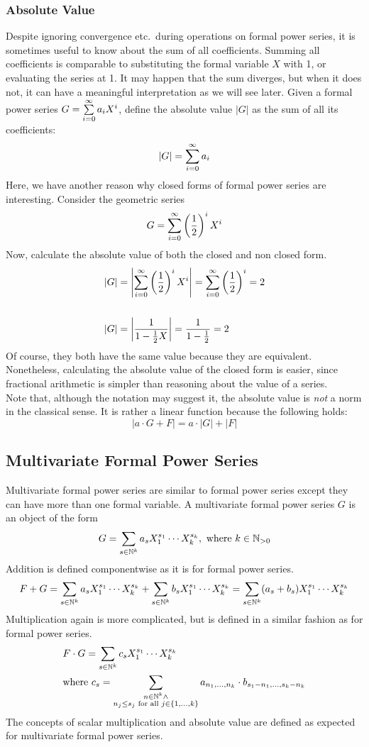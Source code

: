 \subsubsection*{Absolute Value}
Despite ignoring convergence etc.\ during operations on formal power series, it is sometimes useful to know about the sum of all coefficients.
Summing all coefficients is comparable to substituting the formal variable $X$ with 1, or evaluating the series at 1.
It may happen that the sum diverges, but when it does not, it can have a meaningful interpretation as we will see later.
Given a formal power series $G = \sum\limits_{i = 0}^{\infty} a_i X^i$, define the absolute value $|G|$ as the sum of all its coefficients:
\[ |G| = \sum\limits_{i = 0}^{\infty} a_i \]
Here, we have another reason why closed forms of formal power series are interesting.
Consider the geometric series
\[ G = \sum\limits_{i = 0}^{\infty} \left( \frac{1}{2} \right)^i X^i \]
Now, calculate the absolute value of both the closed and non closed form.
\begin{align*}
	|G| &= \left| \sum\limits_{i = 0}^{\infty} \left( \frac{1}{2} \right)^i X^i \right| = \sum\limits_{i = 0}^{\infty} \left( \frac{1}{2} \right)^i = 2 \\
	\\
	|G| &= \left| \frac{1}{1 - \frac{1}{2} X} \right| = \frac{1}{1 - \frac{1}{2}} = 2
\end{align*}
Of course, they both have the same value because they are equivalent.
Nonetheless, calculating the absolute value of the closed form is easier, since fractional arithmetic is simpler than reasoning about the value of a series. \\
Note that, although the notation may suggest it, the absolute value is \emph{not} a norm in the classical sense.
It is rather a linear function because the following holds:
\[ |a \cdot G + F| = a \cdot |G| + |F| \]

\subsection{Multivariate Formal Power Series}
Multivariate formal power series are similar to formal power series except they can have more than one formal variable.
A multivariate formal power series $G$ is an object of the form
\[ G = \sum\limits_{s \in \mathbb{N}^k} a_s X_1^{s_1} \cdots X_k^{s_k} , \text{ where } k \in \mathbb{N}_{> 0} \]
Addition is defined componentwise as it is for formal power series.
\[ F + G = \sum\limits_{s \in \mathbb{N}^k} a_s X_1^{s_1} \cdots X_k^{s_k} + \sum\limits_{s \in \mathbb{N}^k} b_s X_1^{s_1} \cdots X_k^{s_k} = \sum\limits_{s \in \mathbb{N}^k} (a_s + b_s) X_1^{s_1} \cdots X_k^{s_k} \]
Multiplication again is more complicated, but is defined in a similar fashion as for formal power series.
\begin{align*}
	& F \cdot G = \sum\limits_{s \in \mathbb{N}^k} c_s X_1^{s_1} \cdots X_k^{s_k} \\
	& \text{where } c_s = \sum_{\substack{n \in \mathbb{N}^k \land \\
		n_j \leq s_j \text{ for all } j \in \{1,\dots,k\}}}
		a_{n_1, \dots, n_k} \cdot b_{s_1 - n_1, \dots, s_k - n_k}
\end{align*}
The concepts of scalar multiplication and absolute value are defined as expected for multivariate formal power series.

